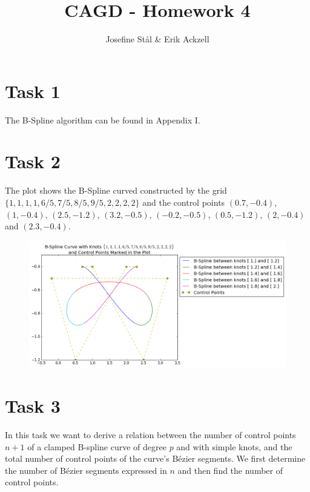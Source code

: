 \documentclass[]{article}
\title{CAGD - Homework 4}
\author{Josefine St{\aa}l \& Erik Ackzell}
\begin{document}
\maketitle
\section*{Task 1}
The B-Spline algorithm can be found in Appendix I. 

\section*{Task 2}
The plot shows the B-Spline curved constructed by the grid $\{1,1,1,1,6/5,7/5,8/5,9/5,2,2,2,2\}$ and the control points $(0.7,-0.4)$, $(1,-0.4)$, $(2.5,-1.2)$, $(3.2,-0.5)$, $(-0.2,-0.5)$, $(0.5,-1.2)$, $(2,-0.4)$ and $(2.3,-0.4)$. 
\begin{figure}[h!]
	\includegraphics[scale=0.4]{task2}
\end{figure}

\section*{Task 3}
In this task we want to derive a relation between the number of control points $n+1$ of a clamped B-spline curve of degree $p$ and with simple knots, and the total number of control points of the curve's B\'{e}zier segments. We first determine the number of B\'{e}zier segments expressed in $n$ and then find the number of control points.
\end{document}
